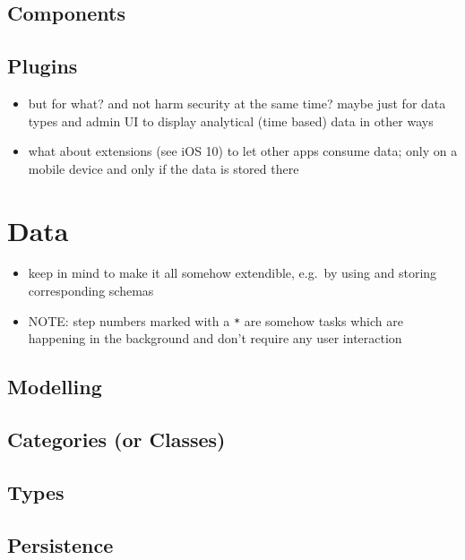 \documentclass[12pt,english,a4paper,titlepage,cleardoublepage=empty,dottedtoc]{report}
\providecommand{\tightlist}{%
  \setlength{\itemsep}{0pt}\setlength{\parskip}{0pt}}
\begin{document}
\subsection{Components}\label{components}

\subsection{Plugins}\label{plugins}

\begin{itemize}
\tightlist
\item
  but for what? and not harm security at the same time? maybe just for
  data types and admin UI to display analytical (time based) data in
  other ways
\item
  what about extensions (see iOS 10) to let other apps consume data;
  only on a mobile device and only if the data is stored there
\end{itemize}

\section{Data}\label{data}

\begin{itemize}
\item
  keep in mind to make it all somehow extendible, e.g.~by using and
  storing corresponding schemas
\item
  NOTE: step numbers marked with a \texttt{*} are somehow tasks which
  are happening in the background and don't require any user interaction
\end{itemize}

\subsection{Modelling}\label{modelling}

\subsection{Categories (or Classes)}\label{categories-or-classes}

\subsection{Types}\label{types}

\subsection{Persistence}\label{persistence}
\end{document}
